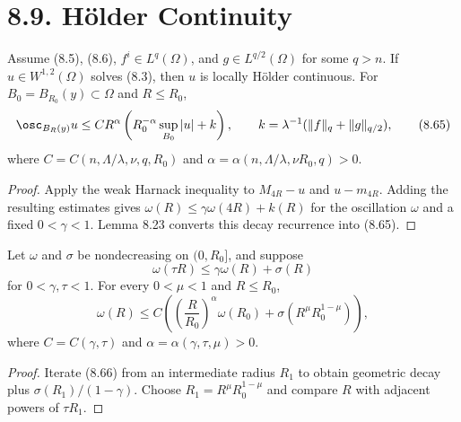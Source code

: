 \section*{8.9. H\"older Continuity}

\begin{theorem}
\label{gt-thm-8-22-interior-holder}
Assume (8.5), (8.6), $f^i\in L^q(\Omega)$, and
$g\in L^{q/2}(\Omega)$ for some $q>n$. If $u\in W^{1,2}(\Omega)$ solves
(8.3), then $u$ is locally H\"older continuous. For
$B_0=B_{R_0}(y)\subset\Omega$ and $R\leq R_0$,
\begin{equation}
\osc_{B_R(y)}u\leq CR^\alpha
\left(R_0^{-\alpha}\sup_{B_0}|u|+k\right),
\qquad k=\lambda^{-1}(\|f\|_q+\|g\|_{q/2}),
\tag{8.65}
\end{equation}
where $C=C(n,\Lambda/\lambda,\nu,q,R_0)$ and
$\alpha=\alpha(n,\Lambda/\lambda,\nu R_0,q)>0$.
\end{theorem}
\begin{proof}
\sketch Apply the weak Harnack inequality to
$M_{4R}-u$ and $u-m_{4R}$. Adding the resulting estimates gives
$\omega(R)\leq\gamma\omega(4R)+k(R)$ for the oscillation $\omega$ and a fixed
$0<\gamma<1$. Lemma 8.23 converts this decay recurrence into (8.65).
\end{proof}

\begin{lemma}
\label{gt-lem-8-23-oscillation-iteration}
Let $\omega$ and $\sigma$ be nondecreasing on $(0,R_0]$, and suppose
\begin{equation}
\omega(\tau R)\leq\gamma\omega(R)+\sigma(R)
\tag{8.66}
\end{equation}
for $0<\gamma,\tau<1$. For every $0<\mu<1$ and $R\leq R_0$,
\begin{equation}
\omega(R)\leq C\left(
\left(\frac R{R_0}\right)^\alpha\omega(R_0)
+\sigma(R^\mu R_0^{1-\mu})\right),
\tag{8.67}
\end{equation}
where $C=C(\gamma,\tau)$ and $\alpha=\alpha(\gamma,\tau,\mu)>0$.
\end{lemma}
\begin{proof}
\sketch Iterate (8.66) from an intermediate radius $R_1$ to obtain geometric
decay plus $\sigma(R_1)/(1-\gamma)$. Choose
$R_1=R^\mu R_0^{1-\mu}$ and compare $R$ with adjacent powers of $\tau R_1$.
\end{proof}

